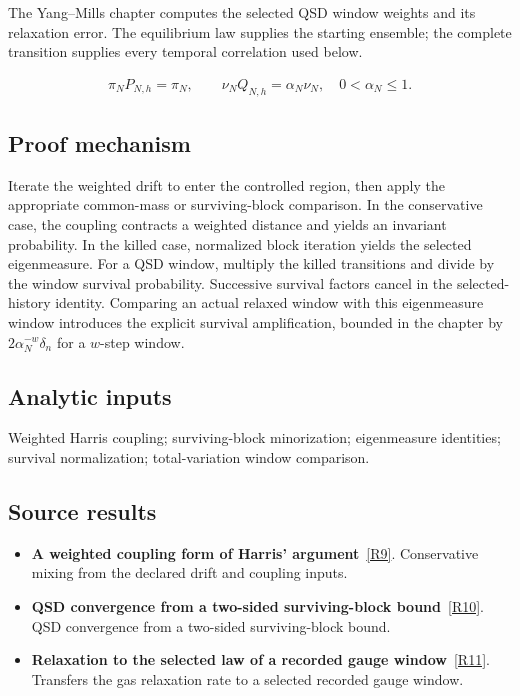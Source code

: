 \documentclass[11pt,a4paper]{article}
\begin{document}
The Yang--Mills chapter computes the selected QSD window weights and its relaxation error. The equilibrium law supplies the starting ensemble; the complete transition supplies every temporal correlation used below.

\begin{gather*}
\pi_NP_{N,h}=\pi_N,\qquad \nu_NQ_{N,h}=\alpha_N\nu_N,\quad 0<\alpha_N\le1.
\end{gather*}
\subsection*{Proof mechanism}
Iterate the weighted drift to enter the controlled region, then apply the appropriate common-mass or surviving-block comparison. In the conservative case, the coupling contracts a weighted distance and yields an invariant probability. In the killed case, normalized block iteration yields the selected eigenmeasure. For a QSD window, multiply the killed transitions and divide by the window survival probability. Successive survival factors cancel in the selected-history identity. Comparing an actual relaxed window with this eigenmeasure window introduces the explicit survival amplification, bounded in the chapter by \(2\alpha_N^{-w}\delta_n\) for a \(w\)-step window.
\subsection*{Analytic inputs}
Weighted Harris coupling; surviving-block minorization; eigenmeasure identities; survival normalization; total-variation window comparison.
\subsection*{Source results}
\begin{itemize}
\item \textbf{A weighted coupling form of Harris' argument}~\hyperref[src:thm-convergence-conservative-harris]{[R9]}. Conservative mixing from the declared drift and coupling inputs.
\item \textbf{QSD convergence from a two-sided surviving-block bound}~\hyperref[src:thm-main-convergence]{[R10]}. QSD convergence from a two-sided surviving-block bound.
\item \textbf{Relaxation to the selected law of a recorded gauge window}~\hyperref[src:thm-ym-qsd-window-relaxation]{[R11]}. Transfers the gas relaxation rate to a selected recorded gauge window.
\end{itemize}
\end{document}
